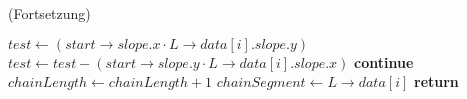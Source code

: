\begin{algorithm}[ht]
\caption{ (Fortsetzung)}
\label{alg:findchainoflines3}
\begin{algorithmic}[1]
		\State $\mathit{test} \gets (\mathit{start \to slope.x} \cdot L\mathit{\to data}[i]\mathit{.slope.y})$
		\State $\mathit{test} \gets \mathit{test} - (\mathit{start \to slope.y} \cdot L\mathit{\to data}[i]\mathit{.slope.x})$
			\State \textbf{continue}
		\EndIf
		\State $\mathit{chainLength} \gets \mathit{chainLength} + 1$
		\State $\mathit{chainSegment} \gets L\mathit{\to data}[i]$
		\State {}
			\State {}
			\State \textbf{return}
		\EndIf
\end{algorithmic}
\end{algorithm}
